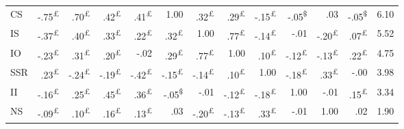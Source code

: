 \documentclass{singlecol-new}
\theoremstyle{TH}{
\newtheorem{lemma}{Lemma}
\newtheorem{theorem}[lemma]{Theorem}
\newtheorem{corrolary}[lemma]{Corrolary}
\newtheorem{conjecture}[lemma]{Conjecture}
\newtheorem{proposition}[lemma]{Proposition}
\newtheorem{claim}[lemma]{Claim}
\newtheorem{stheorem}[lemma]{Wrong Theorem}
\newtheorem{algorithm}{Algorithm}
}
\theoremstyle{THrm}{
\newtheorem{definition}{Definition}[section]
\newtheorem{question}{Question}[section]
\newtheorem{remark}{Remark}
\newtheorem{scheme}{Scheme}
}
\theoremstyle{THhit}{
\newtheorem{case}{Case}[section]
}
\begin{document}
\begin{table*}[h!]
\begin{tabular}{lrrrrrrrrrrrr}
		CS & \cellcolor{gray!37}-.75\textsuperscript{£} & \cellcolor{gray!35}.70\textsuperscript{£} & \cellcolor{gray!21}.42\textsuperscript{£} & \cellcolor{gray!20}.41\textsuperscript{£} & \cellcolor{gray!50}1.00 & \cellcolor{gray!16}.32\textsuperscript{£} & \cellcolor{gray!14}.29\textsuperscript{£} & \cellcolor{gray!7}-.15\textsuperscript{£} & \cellcolor{gray!2}-.05\textsuperscript{\$} & \cellcolor{gray!1}.03 & \cellcolor{gray!2}-.05\textsuperscript{\$} & 6.10 \\
		IS & \cellcolor{gray!18}-.37\textsuperscript{£} & \cellcolor{gray!20}.40\textsuperscript{£} & \cellcolor{gray!16}.33\textsuperscript{£} & \cellcolor{gray!11}.22\textsuperscript{£} & \cellcolor{gray!16}.32\textsuperscript{£} & \cellcolor{gray!50}1.00 & \cellcolor{gray!38}.77\textsuperscript{£} & \cellcolor{gray!7}-.14\textsuperscript{£} & \cellcolor{gray!0}-.01 & \cellcolor{gray!10}-.20\textsuperscript{£} & \cellcolor{gray!3}.07\textsuperscript{£} & 5.52 \\
		IO & \cellcolor{gray!11}-.23\textsuperscript{£} & \cellcolor{gray!15}.31\textsuperscript{£} & \cellcolor{gray!10}.20\textsuperscript{£} & \cellcolor{gray!1}-.02 & \cellcolor{gray!14}.29\textsuperscript{£} & \cellcolor{gray!38}.77\textsuperscript{£} & \cellcolor{gray!50}1.00 & \cellcolor{gray!5}.10\textsuperscript{£} & \cellcolor{gray!6}-.12\textsuperscript{£} & \cellcolor{gray!6}-.13\textsuperscript{£} & \cellcolor{gray!11}.22\textsuperscript{£} & 4.75 \\
		SSR & \cellcolor{gray!11}.23\textsuperscript{£} & \cellcolor{gray!12}-.24\textsuperscript{£} & \cellcolor{gray!9}-.19\textsuperscript{£} & \cellcolor{gray!21}-.42\textsuperscript{£} & \cellcolor{gray!7}-.15\textsuperscript{£} & \cellcolor{gray!7}-.14\textsuperscript{£} & \cellcolor{gray!5}.10\textsuperscript{£} & \cellcolor{gray!50}1.00 & \cellcolor{gray!9}-.18\textsuperscript{£} & \cellcolor{gray!16}.33\textsuperscript{£} & \cellcolor{gray!0}-.00 & 3.98 \\
		II & \cellcolor{gray!8}-.16\textsuperscript{£} & \cellcolor{gray!12}.25\textsuperscript{£} & \cellcolor{gray!22}.45\textsuperscript{£} & \cellcolor{gray!18}.36\textsuperscript{£} & \cellcolor{gray!2}-.05\textsuperscript{\$} & \cellcolor{gray!0}-.01 & \cellcolor{gray!6}-.12\textsuperscript{£} & \cellcolor{gray!9}-.18\textsuperscript{£} & \cellcolor{gray!50}1.00 & \cellcolor{gray!0}-.01 & \cellcolor{gray!7}.15\textsuperscript{£} & 3.34 \\
		NS & \cellcolor{gray!4}-.09\textsuperscript{£} & \cellcolor{gray!5}.10\textsuperscript{£} & \cellcolor{gray!8}.16\textsuperscript{£} & \cellcolor{gray!6}.13\textsuperscript{£} & \cellcolor{gray!1}.03 & \cellcolor{gray!10}-.20\textsuperscript{£} & \cellcolor{gray!6}-.13\textsuperscript{£} & \cellcolor{gray!16}.33\textsuperscript{£} & \cellcolor{gray!0}-.01 & \cellcolor{gray!50}1.00 & \cellcolor{gray!1}.02 & 1.90 \\

\end{tabular}
\end{table*}
\end{document}
